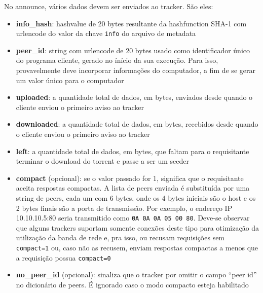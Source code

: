 No \gls*{announce}, vários dados devem ser enviados ao \gls*{tracker}. São eles:

\begin{itemize}
    \item \textbf{info\_hash}: \gls*{hashvalue} de 20 bytes resultante da
    \gls*{hashfunction} SHA-1 com \gls*{urlencode} do valor da chave \verb|info| do
    arquivo de \gls*{metadata}

    \item \textbf{peer\_id}: \gls*{string} com \gls*{urlencode} de 20 bytes usado como
    identificador único do programa cliente, gerado no ínício da sua execução. Para
    isso, provavelmente deve incorporar informações do computador, a fim de se gerar um
    valor único para o computador

    \item \textbf{uploaded}: a quantidade total de dados, em bytes, enviados desde
    quando o cliente enviou o primeiro aviso ao \gls*{tracker}

    \item \textbf{downloaded}: a quantidade total de dados, em bytes, recebidos desde
    quando o cliente enviou o primeiro aviso ao \gls*{tracker}

    \item \textbf{left}: a quantidade total de dados, em bytes, que faltam para o
    requisitante terminar o download do \gls*{torrent} e passe a ser um \gls*{seeder}

    \item \textbf{compact} (opcional): se o valor passado for 1, significa que o
    requisitante aceita respostas compactas. A lista de \glspl*{peer} enviada é
    substituída por uma \gls*{string} de peers, cada um com 6 bytes, onde os 4 bytes
    iniciais são o host e os 2 bytes finais são a porta de transmissão. Por exemplo, o
    endereço IP 10.10.10.5:80 seria transmitido como \verb|0A 0A 0A 05 00 80|. Deve-se
    observar que alguns \glspl*{tracker} suportam somente conexões deste tipo para
    otimização da utilização da banda de rede e, pra isso, ou recusam requisições sem
    \verb|compact=1| ou, caso não as recusem, enviam respostas compactas a menos que a
    requisição possua \verb|compact=0|

    \item \textbf{no\_peer\_id} (opcional): sinaliza que o \gls*{tracker} por omitir o
    campo ``\gls*{peer} id'' no dicionário de \glspl*{peer}. É ignorado caso o modo
    compacto esteja habilitado


\end{itemize}
